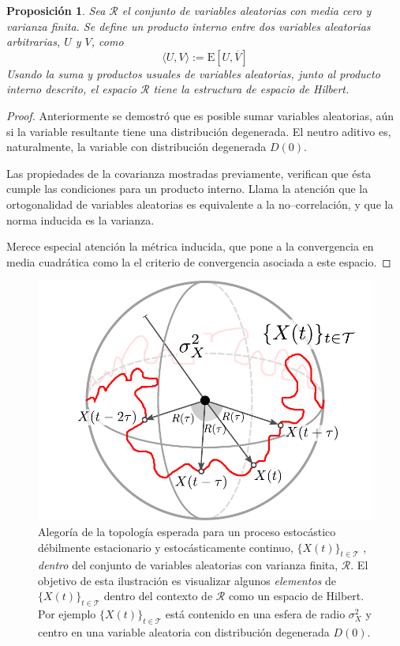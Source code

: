 \documentclass[12pt,letterpaper]{book}
\newtheorem{proposicion}[teorema]{Proposición}
\newcommand{\E}[1]{\mathrm{E}\left[ #1 \right]}
\newcommand{\xt}{$\{X(t)\}_{t\in \mathcal{T}}$ }
\begin{document}
\begin{proposicion}
Sea $\mathcal{R}$ el conjunto de variables aleatorias con media cero y varianza finita. Se define un producto interno entre dos variables aleatorias arbitrarias, $U$ y $V$, como
\begin{equation}
\langle U , V \rangle := \E{U, \overline{V}}
\end{equation}
Usando la suma y productos usuales de variables aleatorias, junto al producto interno descrito, el espacio $\mathcal{R}$ tiene la estructura de espacio de Hilbert.
\end{proposicion}

\begin{proof}
Anteriormente se demostró que es posible sumar variables aleatorias, aún si la variable resultante tiene una distribución degenerada.
%
El neutro aditivo es, naturalmente, la variable con distribución degenerada $D(0)$.


Las propiedades de la covarianza mostradas previamente, verifican que ésta cumple las condiciones para un producto interno. Llama la atención que la ortogonalidad de variables aleatorias es equivalente a la no--correlación, y que la norma inducida es la varianza.

Merece especial atención la métrica inducida, que pone a la convergencia en media cuadrática como la el criterio de convergencia asociada a este espacio.
\end{proof}

\begin{figure}
\centering
\includegraphics[width=.6\textwidth]{./img_diagramas/esfera_v1.pdf}
\caption{Alegoría de la topología esperada para un proceso estocástico débilmente estacionario y estocásticamente continuo, \xt , \textit{dentro} del conjunto de variables aleatorias con varianza finita, $\mathcal{R}$.
%
El objetivo de esta ilustración es visualizar algunos \textit{elementos} de \xt dentro del contexto de $\mathcal{R}$ como un espacio de Hilbert. Por ejemplo \xt está contenido en una esfera de radio $\sigma_X^2$ y centro en una variable aleatoria con distribución degenerada $D(0)$.}
\end{figure}
\end{document}
